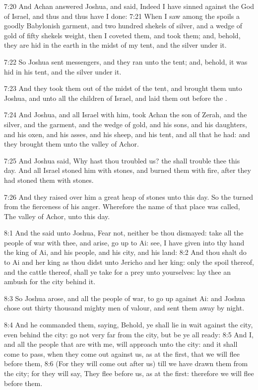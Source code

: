 7:20 And Achan answered Joshua, and said, Indeed I have sinned against
the \LORD God of Israel, and thus and thus have I done: 7:21 When I saw
among the spoils a goodly Babylonish garment, and two hundred shekels
of silver, and a wedge of gold of fifty shekels weight, then I coveted
them, and took them; and, behold, they are hid in the earth in the
midst of my tent, and the silver under it.

7:22 So Joshua sent messengers, and they ran unto the tent; and,
behold, it was hid in his tent, and the silver under it.

7:23 And they took them out of the midst of the tent, and brought them
unto Joshua, and unto all the children of Israel, and laid them out
before the \LORD.

7:24 And Joshua, and all Israel with him, took Achan the son of Zerah,
and the silver, and the garment, and the wedge of gold, and his sons,
and his daughters, and his oxen, and his asses, and his sheep, and his
tent, and all that he had: and they brought them unto the valley of
Achor.

7:25 And Joshua said, Why hast thou troubled us? the \LORD shall
trouble thee this day. And all Israel stoned him with stones, and
burned them with fire, after they had stoned them with stones.

7:26 And they raised over him a great heap of stones unto this day. So
the \LORD turned from the fierceness of his anger. Wherefore the name
of that place was called, The valley of Achor, unto this day.

8:1 And the \LORD said unto Joshua, Fear not, neither be thou dismayed:
take all the people of war with thee, and arise, go up to Ai: see, I
have given into thy hand the king of Ai, and his people, and his city,
and his land: 8:2 And thou shalt do to Ai and her king as thou didst
unto Jericho and her king: only the spoil thereof, and the cattle
thereof, shall ye take for a prey unto yourselves: lay thee an ambush
for the city behind it.

8:3 So Joshua arose, and all the people of war, to go up against Ai:
and Joshua chose out thirty thousand mighty men of valour, and sent
them away by night.

8:4 And he commanded them, saying, Behold, ye shall lie in wait
against the city, even behind the city: go not very far from the city,
but be ye all ready: 8:5 And I, and all the people that are with me,
will approach unto the city: and it shall come to pass, when they come
out against us, as at the first, that we will flee before them, 8:6
(For they will come out after us) till we have drawn them from the
city; for they will say, They flee before us, as at the first:
therefore we will flee before them.

